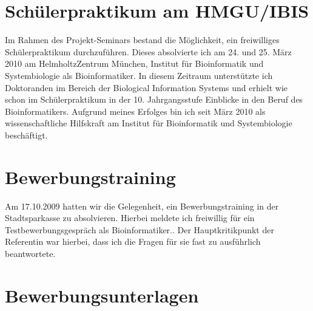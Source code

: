 \documentclass[a4paper,12pt,oneside]{scrbook}
\begin{document}
\section{Schülerpraktikum am HMGU/IBIS}
Im Rahmen des Projekt-Seminars bestand die Möglichkeit, ein freiwilliges Schülerpraktikum durchzuführen.
Dieses absolvierte ich am 24. und 25. März 2010 am HelmholtzZentrum München, Institut für Bioinformatik und Systembiologie als Bioinformatiker.
In diesem Zeitraum unterstützte ich Doktoranden im Bereich der Biological Information Systems und erhielt wie schon im Schülerpraktikum in der 10. Jahrgangsstufe Einblicke in den Beruf des Bioinformatikers.
Aufgrund meines Erfolges bin ich seit März 2010 als wissenschaftliche Hilfskraft am Institut für Bioinformatik und Systembiologie beschäftigt.
\section{Bewerbungstraining}
Am 17.10.2009 hatten wir die Gelegenheit, ein Bewerbungstraining in der Stadtsparkasse zu absolvieren.
Hierbei meldete ich freiwillig für ein Testbewerbungsgespräch als Bioinformatiker..
Der Hauptkritikpunkt der Referentin war hierbei, dass ich die Fragen für sie fast zu ausführlich beantwortete.
\newpage\section{Bewerbungsunterlagen}\newpage
\end{document}
